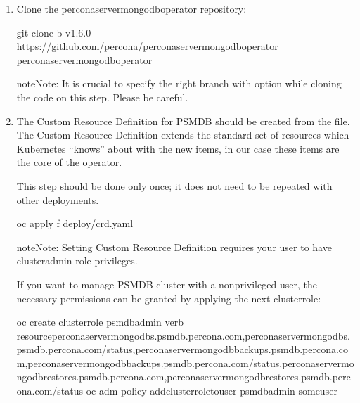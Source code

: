 \documentclass[letterpaper,10pt,english]{sphinxmanual}
\begin{document}
\label{\detokenize{openshift:install-percona-server-for-mongodb-on-openshift}}\label{\detokenize{openshift::doc}}\begin{enumerate}
%
\setcounter{enumi}{-1}
\item {} 
Clone the percona\sphinxhyphen{}server\sphinxhyphen{}mongodb\sphinxhyphen{}operator repository:

\begin{sphinxVerbatim}[commandchars=\\\{\}]
git clone \PYGZhy{}b v1.6.0 https://github.com/percona/percona\PYGZhy{}server\PYGZhy{}mongodb\PYGZhy{}operator
 percona\PYGZhy{}server\PYGZhy{}mongodb\PYGZhy{}operator
\end{sphinxVerbatim}

\begin{sphinxadmonition}{note}{Note:}
It is crucial to specify the right branch with 
option while cloning the code on this step. Please be careful.
\end{sphinxadmonition}

\item {} 
The Custom Resource Definition for PSMDB should be created from the
 file. The Custom Resource Definition extends the
standard set of resources which Kubernetes “knows” about with the new
items, in our case these items are the core of the operator.

This step should be done only once; it does not need to be repeated with other deployments.

\begin{sphinxVerbatim}[commandchars=\\\{\}]
\PYGZdl{} oc apply \PYGZhy{}f deploy/crd.yaml
\end{sphinxVerbatim}

\begin{sphinxadmonition}{note}{Note:}
Setting Custom Resource Definition requires your user to
have cluster\sphinxhyphen{}admin role privileges.
\end{sphinxadmonition}

If you want to manage PSMDB cluster with a non\sphinxhyphen{}privileged user, the
necessary permissions can be granted by applying the next clusterrole:

\begin{sphinxVerbatim}[commandchars=\\\{\}]
\PYGZdl{} oc create clusterrole psmdb\PYGZhy{}admin \PYGZhy{}\PYGZhy{}verb \PYGZhy{}\PYGZhy{}resourceperconaservermongodbs.psmdb.percona.com,perconaservermongodbs.psmdb.percona.com/status,perconaservermongodbbackups.psmdb.percona.com,perconaservermongodbbackups.psmdb.percona.com/status,perconaservermongodbrestores.psmdb.percona.com,perconaservermongodbrestores.psmdb.percona.com/status
\PYGZdl{} oc adm policy add\PYGZhy{}cluster\PYGZhy{}role\PYGZhy{}to\PYGZhy{}user psmdb\PYGZhy{}admin \PYGZlt{}some\PYGZhy{}user\PYGZgt{}
\end{sphinxVerbatim}


\end{enumerate}
\end{document}
